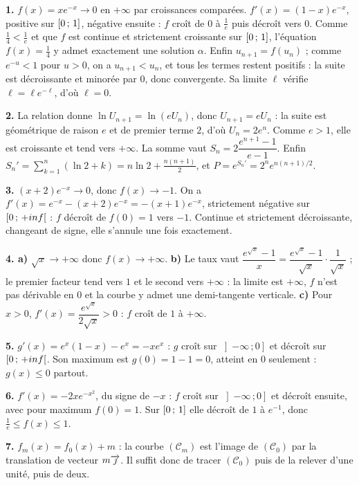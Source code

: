 \begin{corrige}[annales]
\textbf{1.} $f(x) = xe^{-x}\to0$ en $+\infty$ par croissances comparées.
$f'(x) = (1-x)e^{-x}$, positive sur $\left[0\,;\,1\right]$, négative ensuite :
$f$ croît de $0$ à $\frac1e$ puis décroît vers $0$. Comme
$\frac14 < \frac1e$ et que $f$ est continue et strictement croissante sur
$\left[0\,;\,1\right]$, l'équation $f(x) = \frac14$ y admet exactement une
solution $\alpha$. Enfin $u_{n+1} = f(u_{n})$ ; comme $e^{-u}<1$ pour $u>0$,
on a $u_{n+1}<u_{n}$, et tous les termes restent positifs : la suite est
décroissante et minorée par $0$, donc convergente. Sa limite $\ell$ vérifie
$\ell = \ell e^{-\ell}$, d'où $\ell = 0$.

\textbf{2.} La relation donne $\ln U_{n+1} = \ln\!\left(eU_{n}\right)$, donc
$U_{n+1} = eU_{n}$ : la suite est géométrique de raison $e$ et de premier
terme $2$, d'où $U_{n} = 2e^{n}$. Comme $e>1$, elle est croissante et tend
vers $+\infty$. La somme vaut
$S_{n} = 2\dfrac{e^{n+1}-1}{e-1}$. Enfin
$S_{n}' = \sum_{k=1}^{n}\left(\ln2+k\right) = n\ln2+\frac{n(n+1)}{2}$, et
$P = e^{S_{n}'} = 2^{n}e^{n(n+1)/2}$.

\textbf{3.} $(x+2)e^{-x}\to0$, donc $f(x)\to-1$. On a
$f'(x) = e^{-x}-(x+2)e^{-x} = -(x+1)e^{-x}$, strictement négative sur
$\left[0\,;\,+inf\right[$ : $f$ décroît de $f(0) = 1$ vers $-1$. Continue et
strictement décroissante, changeant de signe, elle s'annule une fois
exactement.

\textbf{4. a)} $\sqrt x\to+\infty$ donc $f(x)\to+\infty$.
\textbf{b)} Le taux vaut $\dfrac{e^{\sqrt x}-1}{x}
= \dfrac{e^{\sqrt x}-1}{\sqrt x}\cdot\dfrac{1}{\sqrt x}$ ; le premier facteur
tend vers $1$ et le second vers $+\infty$ : la limite est $+\infty$, $f$ n'est
pas dérivable en $0$ et la courbe y admet une demi-tangente verticale.
\textbf{c)} Pour $x>0$, $f'(x) = \dfrac{e^{\sqrt x}}{2\sqrt x}>0$ : $f$ croît
de $1$ à $+\infty$.

\textbf{5.} $g'(x) = e^{x}(1-x)-e^{x} = -xe^{x}$ : $g$ croît sur
$\left]-\infty\,;0\right]$ et décroît sur $\left[0\,;\,+inf\right[$. Son
maximum est $g(0) = 1-1 = 0$, atteint en $0$ seulement : $g(x)\leq0$ partout.

\textbf{6.} $f'(x) = -2xe^{-x^{2}}$, du signe de $-x$ : $f$ croît sur
$\left]-\infty\,;0\right]$ et décroît ensuite, avec pour maximum $f(0) = 1$.
Sur $\left[0\,;\,1\right]$ elle décroît de $1$ à $e^{-1}$, donc
$\frac1e \leq f(x) \leq 1$.

\textbf{7.} $f_{m}(x) = f_{0}(x)+m$ : la courbe $(\mathcal C_{m})$ est
l'image de $(\mathcal C_{0})$ par la translation de vecteur $m\overrightarrow{\jmath}$. Il
suffit donc de tracer $(\mathcal C_{0})$ puis de la relever d'une unité, puis
de deux.


\end{corrige}
